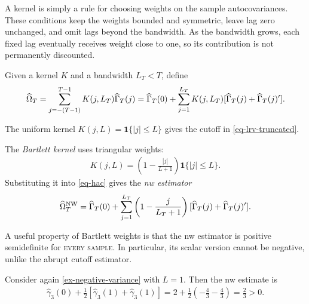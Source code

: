 \documentclass[a4paper,12pt]{article}
\begin{document}
\begin{remark}
	A kernel is simply a rule for choosing weights on the sample autocovariances.
	These conditions keep the weights bounded and symmetric, leave lag zero unchanged,
	and omit lags beyond the bandwidth.
	As the bandwidth grows, each fixed lag eventually receives weight close to one,
	so its contribution is not permanently discounted.
\end{remark}

\begin{definition}
	Given a kernel $K$ and a bandwidth $L_T<T$, define
	\begin{align}\label{eq-hac}
		\widehat\Omega_T
		= \sum_{j=-(T-1)}^{T-1} K(j,L_T)\widehat\Gamma_T(j)
		= \widehat\Gamma_T(0)+\sum_{j=1}^{L_T} K(j,L_T) [\widehat\Gamma_T(j)+\widehat\Gamma_T(j)^{\prime}].
	\end{align}
\end{definition}

\begin{remark}
	The uniform kernel $K(j,L)=\mathbf{1}\{|j|\le L\}$ gives the cutoff in \eqref{eq-lrv-truncated}.
\end{remark}

\begingroup
{}
\begin{definition}
	The \emph{Bartlett kernel} uses triangular weights:
	\begin{align}
		K(j,L)=\left(1-\frac{|j|}{L+1}\right)\mathbf{1}\{|j|\le L\}.
	\end{align}
	Substituting it into \eqref{eq-hac} gives the \emph{\gls{nw} estimator}
	\begin{align}\label{eq-newey-west}
		\widehat\Omega_T^{\mathrm{NW}}
		=\widehat\Gamma_T(0)+\sum_{j=1}^{L_T}\left(1-\frac{j}{L_T+1}\right)
		[\widehat\Gamma_T(j)+\widehat\Gamma_T(j)^{\prime}].
	\end{align}
\end{definition}
\endgroup

\begin{remark}
	A useful property of Bartlett weights is that the \gls{nw} estimator is positive semidefinite for \textsc{every sample}.
	In particular, its scalar version cannot be negative, unlike the abrupt cutoff estimator.
\end{remark}

\begin{example}
	Consider again \autoref{ex-negative-variance} with $L=1$.
	Then the \gls{nw} estimate is
	\begin{align}
		\widehat\gamma_3(0)+\frac12[\widehat\gamma_3(1)+\widehat\gamma_3(1)]
		=2+\frac12\left(-\frac43-\frac43\right)=\frac23>0.
	\end{align}
\end{example}
\end{document}
